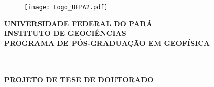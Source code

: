 \documentclass[
	12pt,				%
	openright,			%
	oneside,			%
	a4paper,			%
	english,			%
	brazil				%
	]{abntex2}
\renewcommand{\imprimircapa}{%
\begin{capa}%
	\begin{figure}[!t]
		\begin{center}
			\texttt{[image: Logo\_UFPA2.pdf]}
		\end{center} 
	\end{figure}
			\begin{center}
				{\ABNTEXchapterfont\bfseries{UNIVERSIDADE FEDERAL DO PARÁ \\ INSTITUTO DE GEOCIÊNCIAS \\ PROGRAMA DE PÓS-GRADUAÇÃO EM GEOFÍSICA} }
		\end{center}

\center

\vspace*{1cm}
{\ABNTEXchapterfont\bfseries\large\MakeUppercase{\imprimirautor}}\\
\vspace*{2cm}
{\ABNTEXchapterfont\bfseries\large\imprimirtitulo}\\
\vspace*{2cm}
				{\ABNTEXchapterfont\bfseries\large{PROJETO DE TESE DE DOUTORADO}}
\vspace*{\fill}\\
{\large\MakeUppercase{\imprimirlocal}}
\par
{\large\imprimirdata}
\vspace*{1cm}
\end{capa}
}
\begin{document}

\imprimircapa

\imprimirfolhaderosto*


%


 \begin{fichacatalografica}
   
 \end{fichacatalografica}

%	
%	
%	
%	
%	
%	
%	
%	
\end{document}
